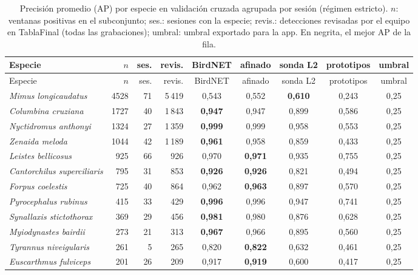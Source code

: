 \begingroup\small
\setlength{\tabcolsep}{4pt}
\begin{longtable}{lrrrccccc}
\caption{Precisión promedio (AP) por especie en validación cruzada agrupada por sesión (régimen estricto). $n$: ventanas positivas en el subconjunto; ses.: sesiones con la especie; revis.: detecciones revisadas por el equipo en TablaFinal (todas las grabaciones); umbral: umbral exportado para la app. En negrita, el mejor AP de la fila.}\label{tab:species}\\
\toprule
Especie & $n$ & ses. & revis. & BirdNET & afinado & sonda L2 & prototipos & umbral\\
\midrule
\endfirsthead
\toprule
Especie & $n$ & ses. & revis. & BirdNET & afinado & sonda L2 & prototipos & umbral\\
\midrule
\endhead
\bottomrule
\endfoot
\textit{Mimus longicaudatus} & 4528 & 71 & 5\,419 & 0{,}543 & 0{,}552 & \textbf{0{,}610} & 0{,}243 & 0{,}25\\
\textit{Columbina cruziana} & 1727 & 40 & 1\,843 & \textbf{0{,}947} & 0{,}947 & 0{,}899 & 0{,}586 & 0{,}25\\
\textit{Nyctidromus anthonyi} & 1324 & 27 & 1\,359 & \textbf{0{,}999} & 0{,}999 & 0{,}958 & 0{,}553 & 0{,}25\\
\textit{Zenaida meloda} & 1044 & 42 & 1\,189 & \textbf{0{,}961} & 0{,}958 & 0{,}859 & 0{,}433 & 0{,}25\\
\textit{Leistes bellicosus} & 925 & 66 & 926 & 0{,}970 & \textbf{0{,}971} & 0{,}935 & 0{,}755 & 0{,}25\\
\textit{Cantorchilus superciliaris} & 795 & 31 & 853 & \textbf{0{,}926} & \textbf{0{,}926} & 0{,}821 & 0{,}494 & 0{,}25\\
\textit{Forpus coelestis} & 725 & 40 & 864 & 0{,}962 & \textbf{0{,}963} & 0{,}897 & 0{,}570 & 0{,}25\\
\textit{Pyrocephalus rubinus} & 415 & 33 & 429 & \textbf{0{,}996} & 0{,}996 & 0{,}947 & 0{,}741 & 0{,}25\\
\textit{Synallaxis stictothorax} & 369 & 29 & 456 & \textbf{0{,}981} & 0{,}980 & 0{,}876 & 0{,}628 & 0{,}25\\
\textit{Myiodynastes bairdii} & 273 & 21 & 313 & \textbf{0{,}967} & 0{,}966 & 0{,}895 & 0{,}560 & 0{,}25\\
\textit{Tyrannus niveigularis} & 261 & 5 & 265 & 0{,}820 & \textbf{0{,}822} & 0{,}632 & 0{,}461 & 0{,}25\\
\textit{Euscarthmus fulviceps} & 201 & 26 & 209 & 0{,}917 & \textbf{0{,}919} & 0{,}600 & 0{,}417 & 0{,}25\\

\end{longtable}
